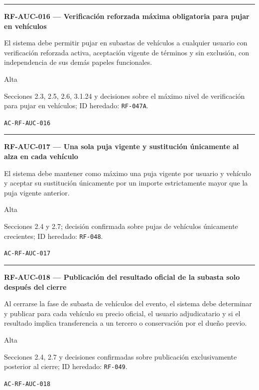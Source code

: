 \documentclass[10pt,letterpaper]{article}
\begin{document}
\vspace{0.25em}\hrule\vspace{0.65em}
\noindent\textbf{RF-AUC-016 --- Verificación reforzada máxima obligatoria para pujar en vehículos}\par
\begin{description}[style=nextline,leftmargin=3.15cm,labelwidth=2.8cm,font=\normalfont\bfseries]
\item[Obligación] El sistema debe permitir pujar en subastas de vehículos a cualquier usuario con verificación reforzada activa, aceptación vigente de términos y sin exclusión, con independencia de sus demás papeles funcionales.
\item[Prioridad] Alta
\item[Procedencia] Secciones 2.3, 2.5, 2.6, 3.1.24 y decisiones sobre el máximo nivel de verificación para pujar en vehículos; ID heredado: \texttt{RF-047A}.
\item[Verificación] \texttt{AC-RF-AUC-016}
\end{description}
\vspace{0.25em}\hrule\vspace{0.65em}
\noindent\textbf{RF-AUC-017 --- Una sola puja vigente y sustitución únicamente al alza en cada vehículo}\par
\begin{description}[style=nextline,leftmargin=3.15cm,labelwidth=2.8cm,font=\normalfont\bfseries]
\item[Obligación] El sistema debe mantener como máximo una puja vigente por usuario y vehículo y aceptar su sustitución únicamente por un importe estrictamente mayor que la puja vigente anterior.
\item[Prioridad] Alta
\item[Procedencia] Secciones 2.4 y 2.7; decisión confirmada sobre pujas de vehículos únicamente crecientes; ID heredado: \texttt{RF-048}.
\item[Verificación] \texttt{AC-RF-AUC-017}
\end{description}
\vspace{0.25em}\hrule\vspace{0.65em}
\noindent\textbf{RF-AUC-018 --- Publicación del resultado oficial de la subasta solo después del cierre}\par
\begin{description}[style=nextline,leftmargin=3.15cm,labelwidth=2.8cm,font=\normalfont\bfseries]
\item[Obligación] Al cerrarse la fase de subasta de vehículos del evento, el sistema debe determinar y publicar para cada vehículo su precio oficial, el usuario adjudicatario y si el resultado implica transferencia a un tercero o conservación por el dueño previo.
\item[Prioridad] Alta
\item[Procedencia] Secciones 2.4, 2.7 y decisiones confirmadas sobre publicación exclusivamente posterior al cierre; ID heredado: \texttt{RF-049}.
\item[Verificación] \texttt{AC-RF-AUC-018}
\end{description}
\end{document}
